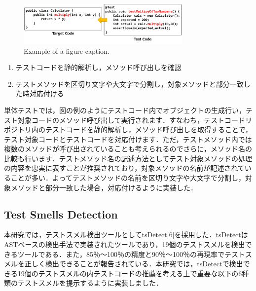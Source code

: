 \documentclass[conference]{IEEEtran}
\begin{document}
\begin{figure}[htbp]
\centerline{\includegraphics[width=8.5cm]{mapping.pdf}}
\caption{Example of a figure caption.}
\label{fig}
\end{figure}

\begin{enumerate}
\renewcommand{\labelenumi}{(\arabic{enumi})}
\item テストコードを静的解析し，メソッド呼び出しを確認
\item テストメソッドを区切り文字や大文字で分割し，対象メソッドと部分一致した時対応付ける
\end{enumerate}

単体テストでは，図の例のようにテストコード内でオブジェクトの生成行い，テスト対象コードのメソッド呼び出して実行されます．すなわち，テストコードリポジトリ内のテストコードを静的解析し，メソッド呼び出しを取得することで，テスト対象コードとテストコードを対応付けます．ただ，テストメソッド内では複数のメソッドが呼び出されていることも考えられるのでさらに，メソッド名の比較も行います．テストメソッド名の記述方法としてテスト対象メソッドの処理の内容を忠実に表すことが推奨されており，対象メソッドの名前が記述されていることが多い．よってテストメソッドの名前を区切り文字や大文字で分割し，対象メソッドと部分一致した場合，対応付けるように実装した．

\subsection{Test Smells Detection}
本研究では，テストスメル検出ツールとしてtsDetect[6]を採用した．tsDetectはASTベースの検出手法で実装されたツールであり，19個のテストスメルを検出できるツールである．また，85％〜100％の精度と90％〜100％の再現率でテストスメルを正しく検出できることが報告されている．本研究では，tsDetectで検出できる19個のテストスメルの内テストコードの推薦を考える上で重要な以下の6種類のテストスメルを提示するように実装しました．
\end{document}
